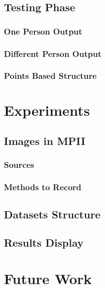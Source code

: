 \documentclass[senior]{IPSstyle}
\begin{document}
\section{Testing Phase} \label{testing phase}
\subsection{One Person Output}
\subsection{Different Person Output}
\subsection{Points Based Structure}

\chapter{Experiments} \label{experiments}
\section{Images in MPII}
\subsection{Sources}
\subsection{Methods to Record}
\section{Datasets Structure}
\section{Results Display}

\chapter{Future Work}\label{future work}



\end{document}
